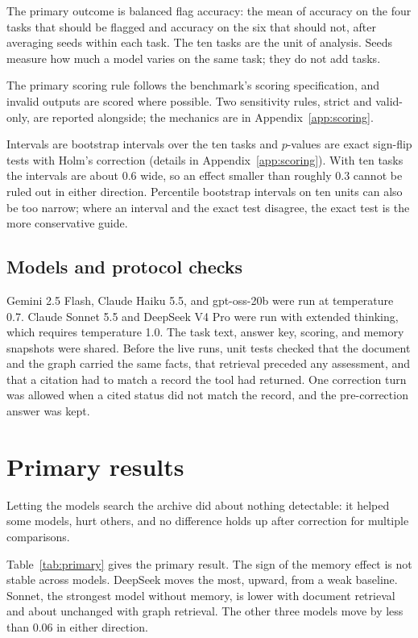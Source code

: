 \documentclass[11pt]{article}
\begin{document}
The primary outcome is balanced flag accuracy: the mean of accuracy on the four tasks that should be flagged and accuracy on the six that should not, after averaging seeds within each task. The ten tasks are the unit of analysis. Seeds measure how much a model varies on the same task; they do not add tasks.

The primary scoring rule follows the benchmark's scoring specification, and invalid outputs are scored where possible. Two sensitivity rules, strict and valid-only, are reported alongside; the mechanics are in Appendix~\ref{app:scoring}.

Intervals are bootstrap intervals over the ten tasks and $p$-values are exact sign-flip tests with Holm's correction (details in Appendix~\ref{app:scoring}). With ten tasks the intervals are about 0.6 wide, so an effect smaller than roughly 0.3 cannot be ruled out in either direction. Percentile bootstrap intervals on ten units can also be too narrow; where an interval and the exact test disagree, the exact test is the more conservative guide.

\subsection{Models and protocol checks}

Gemini 2.5 Flash, Claude Haiku 5.5, and gpt-oss-20b were run at temperature 0.7. Claude Sonnet 5.5 and DeepSeek V4 Pro were run with extended thinking, which requires temperature 1.0. The task text, answer key, scoring, and memory snapshots were shared. Before the live runs, unit tests checked that the document and the graph carried the same facts, that retrieval preceded any assessment, and that a citation had to match a record the tool had returned. One correction turn was allowed when a cited status did not match the record, and the pre-correction answer was kept.

\section{Primary results}
\label{sec:results}

Letting the models search the archive did about nothing detectable: it helped some models, hurt others, and no difference holds up after correction for multiple comparisons.

Table~\ref{tab:primary} gives the primary result. The sign of the memory effect is not stable across models. DeepSeek moves the most, upward, from a weak baseline. Sonnet, the strongest model without memory, is lower with document retrieval and about unchanged with graph retrieval. The other three models move by less than 0.06 in either direction.
\end{document}
